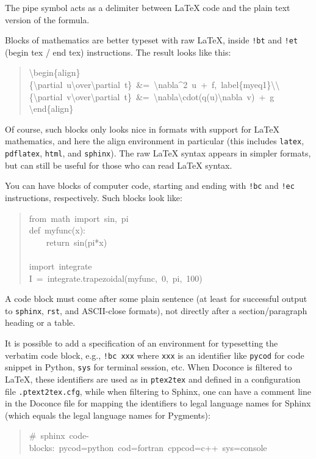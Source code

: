 \documentclass[a4paper]{article}
\begin{document}
The pipe symbol acts as a delimiter between LaTeX code and the plain text
version of the formula.

Blocks of mathematics are better typeset with raw LaTeX, inside
\texttt{!bt} and \texttt{!et} (begin tex / end tex) instructions.
The result looks like this:
%
\begin{quote}{\ttfamily \raggedright \noindent
\textbackslash{}begin\{align\}\\
\{\textbackslash{}partial~u\textbackslash{}over\textbackslash{}partial~t\}~\&=~\textbackslash{}nabla\textasciicircum{}2~u~+~f,~label\{myeq1\}\textbackslash{}\textbackslash{}\\
\{\textbackslash{}partial~v\textbackslash{}over\textbackslash{}partial~t\}~\&=~\textbackslash{}nabla\textbackslash{}cdot(q(u)\textbackslash{}nabla~v)~+~g\\
\textbackslash{}end\{align\}
}
\end{quote}

Of course, such blocks only looks nice in formats with support
for LaTeX mathematics, and here the align environment in particular
(this includes \texttt{latex}, \texttt{pdflatex}, \texttt{html}, and \texttt{sphinx}). The raw
LaTeX syntax appears in simpler formats, but can still be useful
for those who can read LaTeX syntax.

You can have blocks of computer code, starting and ending with
\texttt{!bc} and \texttt{!ec} instructions, respectively. Such blocks look like:
%
\begin{quote}{\ttfamily \raggedright \noindent
from~math~import~sin,~pi\\
def~myfunc(x):\\
~~~~return~sin(pi*x)\\
~\\
import~integrate\\
I~=~integrate.trapezoidal(myfunc,~0,~pi,~100)
}
\end{quote}

A code block must come after some plain sentence (at least for successful
output to \texttt{sphinx}, \texttt{rst}, and ASCII-close formats),
not directly after a section/paragraph heading or a table.

It is possible to add a specification of an
environment for typesetting the verbatim code block, e.g., \texttt{!bc xxx}
where \texttt{xxx} is an identifier like \texttt{pycod} for code snippet in Python,
\texttt{sys} for terminal session, etc. When Doconce is filtered to LaTeX,
these identifiers are used as in \texttt{ptex2tex} and defined in a
configuration file \texttt{.ptext2tex.cfg}, while when filtering
to Sphinx, one can have a comment line in the Doconce file for
mapping the identifiers to legal language names for Sphinx (which equals
the legal language names for Pygments):
%
\begin{quote}{\ttfamily \raggedright \noindent
\#~sphinx~code-blocks:~pycod=python~cod=fortran~cppcod=c++~sys=console
}
\end{quote}
\end{document}

